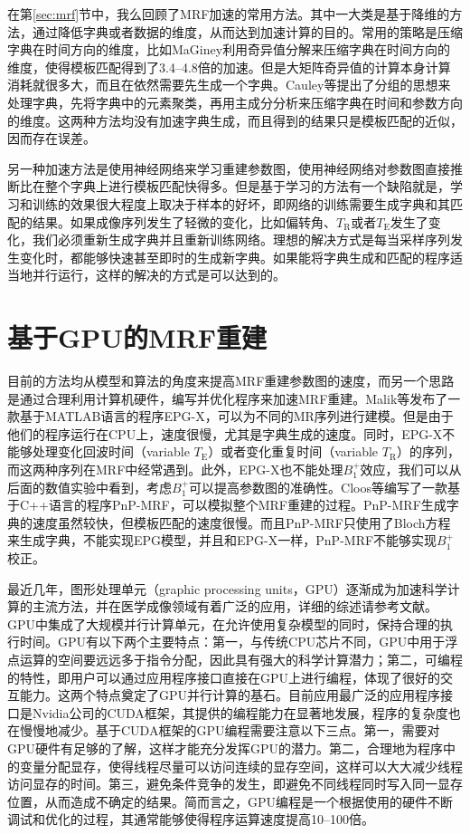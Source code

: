 在第\ref{sec:mrf}节中，我么回顾了MRF加速的常用方法。其中一大类是基于降维的方法，通过降低字典或者数据的维度，从而达到加速计算的目的。常用的策略是压缩字典在时间方向的维度，比如MaGiney\cite{svdmrf}利用奇异值分解来压缩字典在时间方向的维度，使得模板匹配得到了3.4--4.8倍的加速。但是大矩阵奇异值的计算本身计算消耗就很多大，而且在依然需要先生成一个字典。Cauley等\cite{groupingmrf}提出了分组的思想来处理字典，先将字典中的元素聚类，再用主成分分析来压缩字典在时间和参数方向的维度。这两种方法均没有加速字典生成，而且得到的结果只是模板匹配的近似，因而存在误差。

另一种加速方法是使用神经网络来学习重建参数图\cite{cohen2018mr}，使用神经网络对参数图直接推断比在整个字典上进行模板匹配快得多。但是基于学习的方法有一个缺陷就是，学习和训练的效果很大程度上取决于样本的好坏，即网络的训练需要生成字典和其匹配的结果。如果成像序列发生了轻微的变化，比如偏转角、$T_\mathrm{R}$或者$T_\mathrm{E}$发生了变化，我们必须重新生成字典并且重新训练网络。理想的解决方式是每当采样序列发生变化时，都能够快速甚至即时的生成新字典。如果能将字典生成和匹配的程序适当地并行运行，这样的解决的方式是可以达到的。

\section{基于GPU的MRF重建}
目前的方法均从模型和算法的角度来提高MRF重建参数图的速度，而另一个思路是通过合理利用计算机硬件，编写并优化程序来加速MRF重建。Malik等\cite{malik_extended_2018}发布了一款基于MATLAB语言的程序EPG-X，可以为不同的MR序列进行建模。但是由于他们的程序运行在CPU上，速度很慢，尤其是字典生成的速度。同时，EPG-X不能够处理变化回波时间（variable $T_\mathrm{E}$）或者变化重复时间（variable $T_\mathrm{R}$）的序列，而这两种序列在MRF中经常遇到。此外，EPG-X也不能处理$B_1^+$效应，我们可以从后面的数值实验中看到，考虑$B_1^+$可以提高参数图的准确性。Cloos\cite{cline2017air}等编写了一款基于C++语言的程序PnP-MRF，可以模拟整个MRF重建的过程。PnP-MRF生成字典的速度虽然较快，但模板匹配的速度很慢。而且PnP-MRF只使用了Bloch方程来生成字典，不能实现EPG模型，并且和EPG-X一样，PnP-MRF不能够实现$B_1^+$校正。

最近几年，图形处理单元（graphic processing units，GPU）逐渐成为加速科学计算的主流方法，并在医学成像领域有着广泛的应用，详细的综述请参考文献\cite{gpu}。GPU中集成了大规模并行计算单元，在允许使用复杂模型的同时，保持合理的执行时间。GPU有以下两个主要特点：第一，与传统CPU芯片不同，GPU中用于浮点运算的空间要远远多于指令分配，因此具有强大的科学计算潜力；第二，可编程的特性，即用户可以通过应用程序接口直接在GPU上进行编程，体现了很好的交互能力。这两个特点奠定了GPU并行计算的基石。目前应用最广泛的应用程序接口是Nvidia公司的CUDA框架，其提供的编程能力在显著地发展，程序的复杂度也在慢慢地减少。基于CUDA框架的GPU编程需要注意以下三点。第一，需要对GPU硬件有足够的了解，这样才能充分发挥GPU的潜力。第二，合理地为程序中的变量分配显存，使得线程尽量可以访问连续的显存空间，这样可以大大减少线程访问显存的时间。第三，避免条件竞争的发生，即避免不同线程同时写入同一显存位置，从而造成不确定的结果。简而言之，GPU编程是一个根据使用的硬件不断调试和优化的过程，其通常能够使得程序运算速度提高10--100倍。

